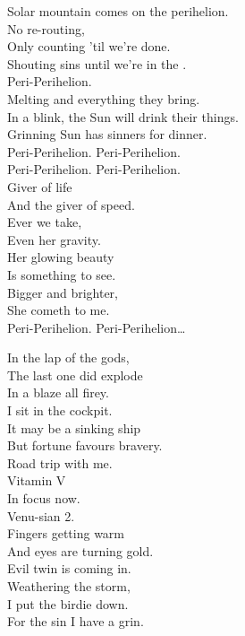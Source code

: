 Solar mountain comes on the perihelion. \\
No re-routing, \\
Only counting 'til we're done. \\
Shouting sins until we're in the . \\
Peri-Perihelion. \\
Melting  and everything they bring. \\
In a blink, the Sun will drink their things. \\
Grinning Sun has sinners for dinner. \\

Peri-Perihelion. Peri-Perihelion. \\
Peri-Perihelion. Peri-Perihelion. \\

Giver of life \\
And the giver of speed. \\
Ever we take, \\
Even her gravity. \\
Her glowing beauty \\
Is something to see. \\
Bigger and brighter, \\
She cometh to me. \\

Peri-Perihelion. Peri-Perihelion… \\





In the lap of the gods, \\
The last one did explode \\
In a blaze all firey. \\
I sit in the cockpit. \\
It may be a sinking ship \\
But fortune favours bravery. \\

Road trip with me. \\
Vitamin V \\
In focus now. \\

Venu-sian 2. \\

Fingers getting warm \\
And eyes are turning gold. \\
Evil twin is coming in. \\
Weathering the storm, \\
I put the birdie down. \\
For the sin I have a grin. \\

